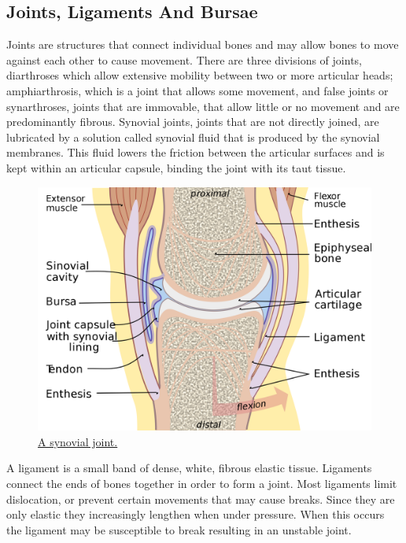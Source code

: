 \hypertarget{joints-ligaments-and-bursae}{%
\subsection{Joints, Ligaments And Bursae}\label{joints-ligaments-and-bursae}}

Joints are structures that connect individual bones and may allow bones to move against each other to cause movement. There are three divisions of joints, diarthroses which allow extensive mobility between two or more articular heads; amphiarthrosis, which is a joint that allows some movement, and false joints or synarthroses, joints that are immovable, that allow little or no movement and are predominantly fibrous. Synovial joints, joints that are not directly joined, are lubricated by a solution called synovial fluid that is produced by the synovial membranes. This fluid lowers the friction between the articular surfaces and is kept within an articular capsule, binding the joint with its taut tissue.



\begin{figure}

{\centering \includegraphics[width=0.7\linewidth]{./figures/locomotion/Joint} 

}

\caption{\href{https://commons.wikimedia.org/wiki/File:Joint.svg}{A synovial joint.}}\label{fig:synovialjoint}
\end{figure}

A ligament is a small band of dense, white, fibrous elastic tissue. Ligaments connect the ends of bones together in order to form a joint. Most ligaments limit dislocation, or prevent certain movements that may cause breaks. Since they are only elastic they increasingly lengthen when under pressure. When this occurs the ligament may be susceptible to break resulting in an unstable joint.



